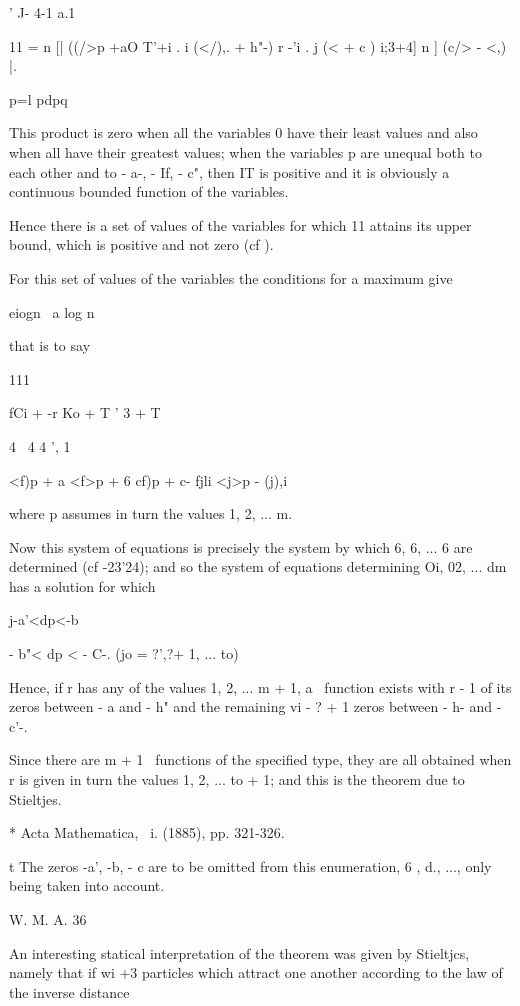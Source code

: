 {{{{{{{ ' J- 4-1 a.1

11 = n [| ((/>p +aO T'+i . i (</),. + h"-) r -'i . j (< + c ) i;3+4] n
] (c/> - <,) |.

p=l pdpq

This product is zero when all the variables 0 have their least values
and also when all have their greatest values; when the variables p
are unequal both to each other and to - a-, - If, - c", then IT is
positive and it is obviously a continuous bounded function of the
variables.

Hence there is a set of values of the variables for which 11 attains
its upper bound, which is positive and not zero (cf ).

For this set of values of the variables the conditions for a maximum
give

eiogn \ a log n \

that is to say

111

fCi + -r Ko + T ' 3 + T

4 \ 4 4 ', 1 \

<f)p + a <f>p + 6 cf)p + c- fjli <j>p - (j),i

where p assumes in turn the values 1, 2, ... m.

Now this system of equations is precisely the system by which 6, 6,
... 6 are determined (cf -23'24); and so the system of
equations determining Oi, 02, ... dm has a solution for which

j-a'<dp<-b%

 - b"< dp < - C-. (jo = ?',?+ 1, ... to)

Hence, if r has any of the values 1, 2, ... m + 1, a \Lame\ function
exists with r - 1 of its zeros between - a and - h" and the remaining
vi - ? + 1 zeros between - h- and - c'-.

Since there are m + 1 \Lame\ functions of the specified type, they are
all obtained when r is given in turn the values 1, 2, ... to + 1; and
this is the theorem due to Stieltjes.

* Acta Mathematica, \ i. (1885), pp. 321-326.

t The zeros -a', -b, - c are to be omitted from this enumeration, 6
, d., ..., only being taken into account.

W. M. A. 36

%
%

An interesting statical interpretation of the theorem was given by
Stieltjcs, namely that if wi +3 particles which attract one another
according to the law of the inverse distance

}}}}}}}
